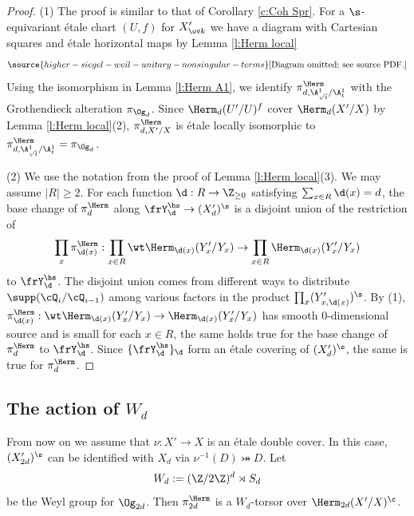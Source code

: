 \begin{proof}
(1) The proof is similar to that of Corollary \ref{c:Coh Spr}. For a $\s$-equivariant \'etale chart $(U,f)$ for $X'_{\ov k}$ we have a diagram with Cartesian squares and \'etale horizontal maps by Lemma \ref{l:Herm local}
\begin{equation}\label{SH chart}
\source{higher-siegel-weil-unitary-nonsingular-terms}
\text{[Diagram omitted; see source PDF.]}
\end{equation}
Using the isomorphism in Lemma \ref{l:Herm A1}, we identify $\pi^{\Herm}_{d, \A^{1}_{\sqrt{t}}/\A^{1}_{t}}$ with the Grothendieck alteration $\pi_{\Og_{d}}$.  Since $\Herm_{d}(U'/U)^{f}$ cover $\Herm_{d}(X'/X)$ by Lemma \ref{l:Herm local}(2), $\pi^{\Herm}_{d,X'/X}$ is
\'etale locally  isomorphic to $\pi^{\Herm}_{d, \A^{1}_{\sqrt{t}}/\A^{1}_{t}}=\pi_{\Og_{d}}$.

(2) We use the notation from the proof of Lemma \ref{l:Herm local}(3). We may assume $|R|\ge2$. For each function $\d: R\to \Z_{\ge0}$ satisfying $\sum_{x\in R}\d(x)=d$, the base change of $\pi^{\Herm}_{d}$ along $\frY_{\d}^{\hs}\to (X'_{d})^{\s}$ is a disjoint union of the restriction of
\begin{equation*}
\prod_{x}\pi^{\Herm}_{\d(x)}: \prod_{x\in R}\wt\Herm_{\d(x)}(Y'_{x}/Y_{x})\to \prod_{x\in R}\Herm_{\d(x)}(Y'_{x}/Y_{x})
\end{equation*}
to $\frY_{\d}^{\hs}$. The disjoint union comes from different ways to distribute $\supp(\cQ_{i}/\cQ_{i-1})$ among various factors in the product $\prod_{x}(Y'_{x,\d(x)})^{\s}$. By (1), $\pi^{\Herm}_{\d(x)}: \wt\Herm_{\d(x)}(Y'_{x}/Y_{x})\to \Herm_{\d(x)}(Y'_{x}/Y_{x})$ has smooth $0$-dimensional source and is small for each $x\in R$, the same holds true for the base change of $\pi^{\Herm}_{d}$ to $\frY_{\d}^{\hs}$. Since $\{\frY_{\d}^{\hs}\}_{\d}$ form an \'etale covering of $(X'_{d})^{\s}$, the same is true for $\pi^{\Herm}_{d}$.
\end{proof}


\subsection{The action of $W_{d}$} \label{ss:Wd act}
From now on we assume that $\nu:X'\to X$ is an \'etale double cover.  In this case, $(X'_{2d})^{\s}$ can be identified with $X_{d}$ via $\nu^{-1}(D)\bij D$. Let
\begin{equation*}
W_{d}:=(\Z/2\Z)^{d}\rtimes S_{d}
\end{equation*}
be the Weyl group for $\Og_{2d}$. Then $\pi^{\Herm}_{2d}$ is a $W_{d}$-torsor over $\Herm_{2d}(X'/X)^{\c}$.

